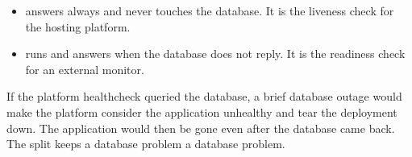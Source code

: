 \begin{itemize}
  \item {} answers always and never touches the database. It is the
        liveness check for the hosting platform.
  \item {} runs  and answers  when the
        database does not reply. It is the readiness check for an external
        monitor.
\end{itemize}

\begin{pitfall}
If the platform healthcheck queried the database, a brief database outage would
make the platform consider the application unhealthy and tear the deployment
down. The application would then be gone even after the database came back. The
split keeps a database problem a database problem.
\end{pitfall}
